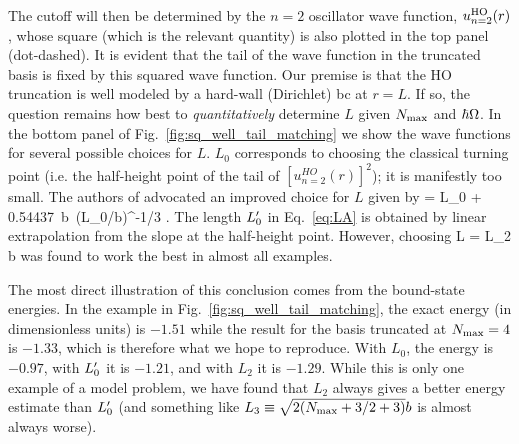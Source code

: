 	The cutoff will then be determined by the $n=2$ oscillator wave
	function, $u_{n=2}^{\rm HO}(r)$, whose square (which is the relevant
	quantity) is also plotted in the top panel (dot-dashed).  It is
	evident that the tail of the wave function in the truncated basis is
	fixed by this squared wave function.  Our premise is that the HO truncation
	is well modeled by a hard-wall (Dirichlet) bc at $r=L$.
	If so, the question remains how best to \emph{quantitatively} determine $L$
	given	${N_{\mathrm{max}}}$ and $\hbar\Omega$.  In the bottom panel of
	Fig.~\ref{fig:sq_well_tail_matching} we show the wave functions	for several
	possible choices for $L$.
	$L_0$ corresponds to choosing the classical
	turning point (i.e. the half-height point of the tail of
	$[u^{HO}_{n=2}(r)]^2$); it is manifestly too small.  The authors of
	\cite{Furnstahl2012} advocated an improved choice for $L$ given by
	\beq
	\LA = L_0 + 0.54437\, b\, (L_0/b)^{-1/3} \;.
  \label{eq:LA}
	\eeq
	The length $L'_0$ in Eq.~\eqref{eq:LA} is obtained by linear extrapolation
	from the slope at the half-height point.
	However, choosing
	\beq
	L = L_2 \equiv {}b
	\label{eq:L2_def}
	\eeq
	was found to work the best in almost all examples.

	The most direct illustration of this conclusion comes from the
	bound-state energies.  In the example in Fig.~\ref{fig:sq_well_tail_matching},
	the exact energy (in dimensionless units) is $-1.51$ while the
	result for the basis truncated at ${N_{\mathrm{max}}}=4$ is $-1.33$, which is therefore
	what we	hope to reproduce.  With $L_0$, the energy is $-0.97$, with $L'_0$ it
	is $-1.21$, and with $L_2$ it is $-1.29$.  While this is only one
	example of a model problem, we have found that $L_2$ always gives a
	better energy estimate than $L'_0$ (and something like
	$L_3 \equiv \sqrt{2 ({N_{\mathrm{max}}} + 3/2 + 3)}b$ is almost always worse).

